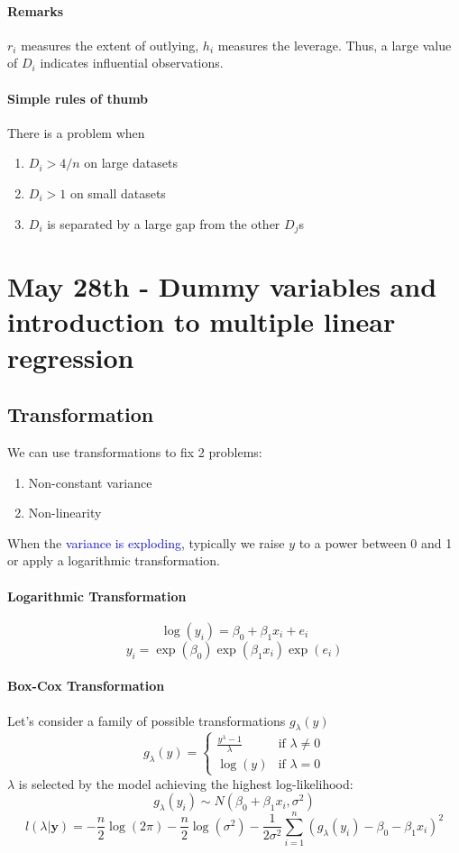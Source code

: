 \documentclass[11pt]{article}
\newcommand{\tb}[1]{\textbf{#1}}
\newcommand{\vy}[0]{\tb{y}}
\begin{document}
\paragraph{Remarks}
$r_i$ measures the extent of outlying, $h_i$ measures the leverage. Thus, a large value of $D_i$ indicates influential observations.
\paragraph{Simple rules of thumb} There is a problem when
\begin{enumerate}
    \item $D_i > 4/n$ on large datasets
    \item $D_i > 1$ on small datasets
    \item $D_i$ is separated by a large gap from the other $D_j$s
\end{enumerate}

\section{May 28th - Dummy variables and introduction to multiple linear regression}
\subsection{Transformation}
We can use transformations to fix 2 problems:
\begin{enumerate}
	\item Non-constant variance
	\item Non-linearity
\end{enumerate}
When the \textcolor{blue}{variance is exploding}, typically we raise $y$ to a power between 0 and 1 or apply a logarithmic transformation.
\paragraph{Logarithmic Transformation}
$$\log(y_i) = \beta_0 + \beta_1 x_i + e_i$$
$$y_i = \exp(\beta_0)\exp(\beta_1x_i)\exp(e_i)$$
\paragraph{Box-Cox Transformation}
Let's consider a family of possible transformations $g_\lambda(y)$
$$g_\lambda(y)=\begin{cases}
	\frac{y^\lambda-1}{\lambda} & \text{if $\lambda \neq 0$} \\
	\log(y) & \text{if $\lambda = 0$}
\end{cases}$$
$\lambda$ is selected by the model achieving the highest log-likelihood:
$$g_\lambda(y_i) \sim N(\beta_0 + \beta_1x_i, \sigma^2)$$
$$l(\lambda|\vy) = -\frac{n}{2}\log(2\pi) - \frac{n}{2}\log(\sigma^2) - \frac{1}{2\sigma^2}\sum_{i=1}^n(g_\lambda(y_i) - \beta_0 - \beta_1x_i)^2$$
\end{document}

